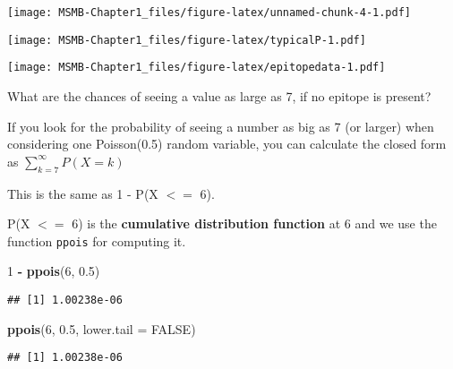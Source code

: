 \documentclass[]{article}
\newenvironment{Shaded}{\begin{snugshade}}{\end{snugshade}}
\newcommand{\KeywordTok}[1]{\textcolor[rgb]{0.13,0.29,0.53}{\textbf{#1}}}
\newcommand{\DataTypeTok}[1]{\textcolor[rgb]{0.13,0.29,0.53}{#1}}
\newcommand{\DecValTok}[1]{\textcolor[rgb]{0.00,0.00,0.81}{#1}}
\newcommand{\FloatTok}[1]{\textcolor[rgb]{0.00,0.00,0.81}{#1}}
\newcommand{\StringTok}[1]{\textcolor[rgb]{0.31,0.60,0.02}{#1}}
\newcommand{\OtherTok}[1]{\textcolor[rgb]{0.56,0.35,0.01}{#1}}
\newcommand{\OperatorTok}[1]{\textcolor[rgb]{0.81,0.36,0.00}{\textbf{#1}}}
\newcommand{\NormalTok}[1]{#1}
\let\origfigure\figure
\let\endorigfigure\endfigure
\renewenvironment{figure}[1][2] {
    \expandafter\origfigure\expandafter[H]
} {
    \endorigfigure
}
\begin{document}
\texttt{[image: MSMB-Chapter1\_files/figure-latex/unnamed-chunk-4-1.pdf]}

\begin{figure}
\centering
\texttt{[image: MSMB-Chapter1\_files/figure-latex/typicalP-1.pdf]}
\caption{Plot of typical data from our generative model for the
background, i.,e., for the false positive hits: 100 positions along the
protein, at each position the count is drawn from a Poisson(0.5) random
variable.}
\end{figure}

\begin{figure}
\centering
\texttt{[image: MSMB-Chapter1\_files/figure-latex/epitopedata-1.pdf]}
\caption{Output of the ELISA array results for 50 patients in the 100
positions.}
\end{figure}

What are the chances of seeing a value as large as 7, if no epitope is
present?

If you look for the probability of seeing a number as big as 7 (or
larger) when considering one Poisson(0.5) random variable, you can
calculate the closed form as \(\sum_{k=7}^{\infty} P(X=k)\)

This is the same as 1 - P(X \(<=\) 6).

P(X \(<=\) 6) is the \textbf{cumulative distribution function} at 6 and
we use the function \texttt{ppois} for computing it.

\begin{Shaded}
\begin{Highlighting}[]
\DecValTok{1} \OperatorTok{-}\StringTok{ }\KeywordTok{ppois}\NormalTok{(}\DecValTok{6}\NormalTok{, }\FloatTok{0.5}\NormalTok{)}
\end{Highlighting}
\end{Shaded}

\begin{verbatim}
## [1] 1.00238e-06
\end{verbatim}

\begin{Shaded}
\begin{Highlighting}[]
\KeywordTok{ppois}\NormalTok{(}\DecValTok{6}\NormalTok{, }\FloatTok{0.5}\NormalTok{, }\DataTypeTok{lower.tail =} \OtherTok{FALSE}\NormalTok{)}
\end{Highlighting}
\end{Shaded}

\begin{verbatim}
## [1] 1.00238e-06
\end{verbatim}
\end{document}
